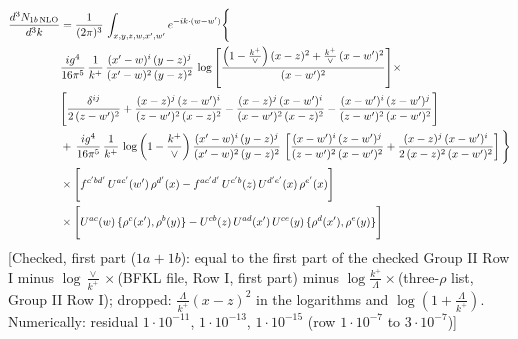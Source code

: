 \documentclass[9pt]{article}
\numberwithin{equation}{section}
\begin{document}
\begin{align}
\frac{d^{3}N_{1b\, \rm NLO}}{d^{3}k} & =  \frac{1}{(2\pi)^{3}}\,\int_{x,y,z,w,x',w^{\prime}} e^{-ik\cdot (w-w')}\Bigg\{\notag \\
&  \frac{ig^{4}}{16\pi^{5}}\,\frac{1}{k^{+}}\, \frac{(x'-w)^{i}\,(y-z)^{j}}{(x'-w)^{2}\,(y-z)^{2}}\,\log{\left[\frac{\left(1-\frac{k^{+}}{\vee}\right)(x-z)^{2}+\frac{k^{+}}{\vee}\,(x-w')^{2}}{(x-w')^{2}}\right]}\times\notag \\ &  \Bigg[\frac{\delta^{ij}}{2\,(z-w')^{2}}+\frac{(x-z)^{j}\,(z-w')^{i}}{(z-w')^{2}\,(x-z)^{2}}-\frac{(x-z)^{j}\,(x-w')^{i}}{(x-w')^{2}\,(x-z)^{2}}-\frac{(x-w')^{i}\,(z-w')^{j}}{(z-w')^{2}\,(x-w')^{2}}\Bigg] \notag \\
& +\,\frac{ig^{4}}{16\pi^{5}}\,\frac{1}{k^{+}}\,\log{\left(1-\frac{k^{+}}{\vee}\right)}\,\frac{(x'-w)^{i}\,(y-z)^{j}}{(x'-w)^{2}\,(y-z)^{2}}\,\left[\frac{(x-w')^{i}\,(z-w')^{j}}{(z-w')^{2}\,(x-w')^{2}}+\frac{(x-z)^{j}\,(x-w')^{i}}{2\,(x-z)^{2}\, (x-w')^{2}}\right]\Bigg\} \notag \\ & \times\Bigg[f^{c'bd'}\,U^{ac'}(w')\,\rho^{d'}(x)-f^{ac'd'}\, U^{c'b}(z)\,U^{d'e'}(x)\,\rho^{e'}(x)\Bigg] \notag \\ & \times \Bigg[U^{ac}(w)\,\{\rho^{c}(x'),\rho^{b}(y)\}-U^{cb}(z)\,U^{ad}(x')\,U^{ce}(y)\, \{\rho^{d}(x'),\rho^{e}(y)\}\Bigg]
\end{align} {\color{red}[Checked, first part ($1a+1b$): equal to the first part of the checked Group II Row I minus $\log\frac{\vee}{k^{+}}\times$(BFKL file, Row I, first part) minus $\log\frac{k^{+}}{\Lambda}\times$(three-$\rho$ list, Group II Row I); dropped: $\frac{\Lambda}{k^{+}}(x-z)^{2}$ in the logarithms and $\log(1+\frac{\Lambda}{k^{+}})$. Numerically: residual $1\cdot10^{-11}$, $1\cdot10^{-13}$, $1\cdot10^{-15}$ (row $1\cdot10^{-7}$ to $3\cdot10^{-7}$)]}\par\noindent
\end{document}

